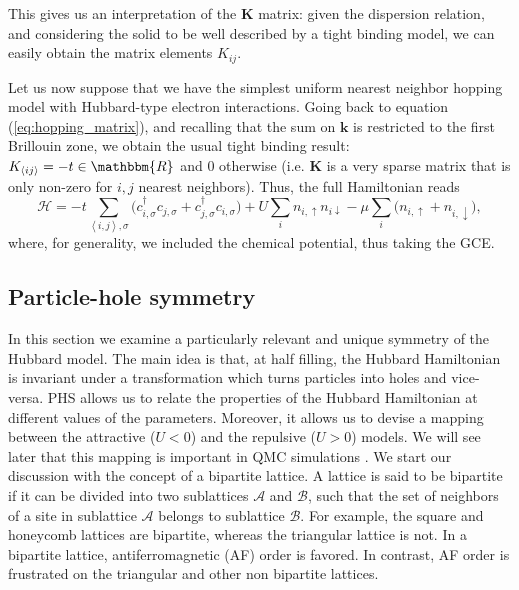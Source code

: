 This gives us an interpretation of the $\bm K$ matrix: given the dispersion relation, and considering the solid to be well described by a tight binding model, we can easily obtain the matrix elements $K_{i j}$.

Let us now suppose that we have the simplest uniform nearest neighbor hopping model with Hubbard-type electron interactions.
Going back to equation (\ref{eq:hopping_matrix}), and recalling that the sum on $\bm k$ is restricted to the first Brillouin zone, we obtain the usual tight binding result: $K_{\left\langle i j \right\rangle} = - t \in \mathbbm{R}$ and $0$ otherwise (i.e. $\bm K$ is a very sparse matrix that is only non-zero for $i, j$ nearest neighbors).
Thus, the full Hamiltonian reads
\begin{equation}\label{eq:hubbard_hamiltonian}
\mathcal{H} = - t \sum_{\left\langle i, j \right\rangle, \sigma} \bigg(c_{i,\sigma}^\dagger c_{j,\sigma} + c_{j,\sigma}^\dagger c_{i,\sigma} \bigg) + U \sum_{i} n_{i,\uparrow} n_{i\downarrow} -\mu \sum_i \bigg( n_{i,\uparrow} + n_{i,\downarrow} \bigg) ,
\end{equation}
where, for generality, we included the chemical potential, thus taking the \acl{GCE}.

\subsection{Particle-hole symmetry}

In this section we examine a particularly relevant and unique symmetry of the Hubbard model.
The main idea is that, at half filling, the Hubbard Hamiltonian is invariant under a transformation which turns particles into holes and vice-versa.
\ac{PHS} allows us to relate the properties of the Hubbard Hamiltonian at different values of the parameters.
Moreover, it allows us to devise a mapping between the attractive ($U < 0$) and the repulsive ($U > 0$) models.
We will see later that this mapping is important in QMC simulations \cite{alavi_quantum_2016}.
We start our discussion with the concept of a bipartite lattice.
A lattice is said to be bipartite if it can be divided into two sublattices $\mathcal{A}$ and $\mathcal{B}$, such that the set of neighbors of a site in sublattice $\mathcal{A}$ belongs to sublattice $\mathcal{B}$.
For example, the square and honeycomb lattices are bipartite, whereas the triangular lattice is not.
In a bipartite lattice, antiferromagnetic (\acs{AF}) order is favored.
In contrast, \acs{AF} order is frustrated on the triangular and other non bipartite lattices.

